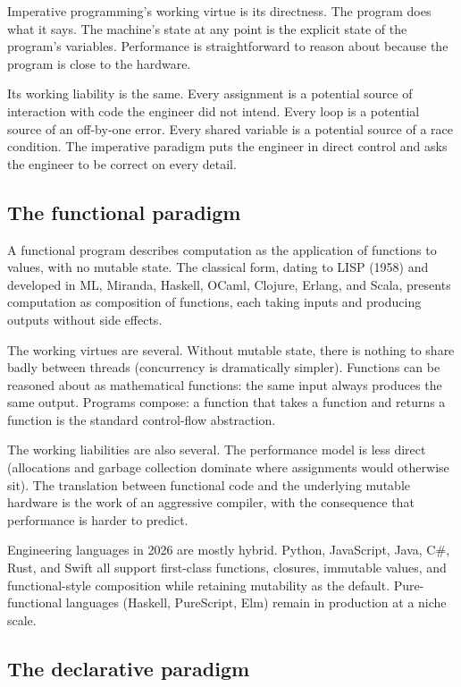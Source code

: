Imperative programming's working virtue is its directness. The program does what it says. The machine's state at any point is the explicit state of the program's variables. Performance is straightforward to reason about because the program is close to the hardware.

Its working liability is the same. Every assignment is a potential source of interaction with code the engineer did not intend. Every loop is a potential source of an off-by-one error. Every shared variable is a potential source of a race condition. The imperative paradigm puts the engineer in direct control and asks the engineer to be correct on every detail.

\subsection{The functional paradigm}

A functional program describes computation as the application of functions to values, with no mutable state. The classical form, dating to LISP (1958) and developed in ML, Miranda, Haskell, OCaml, Clojure, Erlang, and Scala, presents computation as composition of functions, each taking inputs and producing outputs without side effects.

The working virtues are several. Without mutable state, there is nothing to share badly between threads (concurrency is dramatically simpler). Functions can be reasoned about as mathematical functions: the same input always produces the same output. Programs compose: a function that takes a function and returns a function is the standard control-flow abstraction.

The working liabilities are also several. The performance model is less direct (allocations and garbage collection dominate where assignments would otherwise sit). The translation between functional code and the underlying mutable hardware is the work of an aggressive compiler, with the consequence that performance is harder to predict.

Engineering languages in 2026 are mostly hybrid. Python, JavaScript, Java, C\#, Rust, and Swift all support first-class functions, closures, immutable values, and functional-style composition while retaining mutability as the default. Pure-functional languages (Haskell, PureScript, Elm) remain in production at a niche scale.

\subsection{The declarative paradigm}

